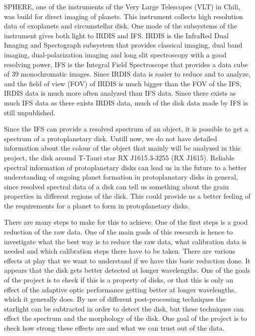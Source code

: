 \documentclass[twoside,single]{lion-msc}
\begin{document}
SPHERE, one of the instruments of the Very Large Telescopes (VLT) in Chili, was build for direct imaging of planets. This instrument collects high resolution data of exoplanets and circumstellar disk. One mode of the subsystems of the instrument gives both light to IRDIS and IFS. IRDIS is the InfraRed Dual Imaging and Spectograph subsystem that provides classical imaging, dual band imaging, dual-polarization imaging and long slit spectroscopy with a good resolving power, IFS is the Integral Field Spectroscope that provides a data cube of 39 monochromatic images. \cite{Observatory2007} Since IRDIS data is easier to reduce and to analyze, and the field of view (FOV) of IRDIS is much bigger than the FOV of the IFS, IRDIS data is much more often analyzed than IFS data. Since there exists as much IFS data as there exists IRDIS data, much of the disk data made by IFS is still unpublished.
\bigskip

Since the IFS can provide a resolved spectrum of an object, it is possible to get a spectrum of a protoplanetary disk. Untill now, we do not have detailed information about the colour of the object that mainly will be analyzed in this project, the disk around T-Tauri star RX J1615.3-3255 (RX J1615). Reliable spectral information of protoplanetary disks can lead us in the future to a better understanding of ongoing planet formation in protoplanatary disks in general, since resolved spectral data of a disk can tell us something about the grain properties in different regions of the disk. This could provide us a better feeling of the requirements for a planet to form in protoplanetary disks. 
\bigskip

There are many steps to make for this to achieve. One of the first steps is a good reduction of the raw data. One of the main goals of this research is hence to investigate what the best way is to reduce the raw data, what calibration data is needed and which calibration steps there have to be taken. There are various effects at play that we want to understand if we have this basic reduction done. It appears that the disk gets better detected at longer wavelengths. One of the goals of the project is to check if this is a property of disks, or that this is only an effect of the adaptive optic performance getting better at longer wavelengths, which it generally does. By use of different post-processing techniques the starlight can be subtracted in order to detect the disk, but these techniques can effect the spectrum and the morphology of the disk. One goal of the project is to check how strong these effects are and what we can trust out of the data.
\bigskip
\end{document}
